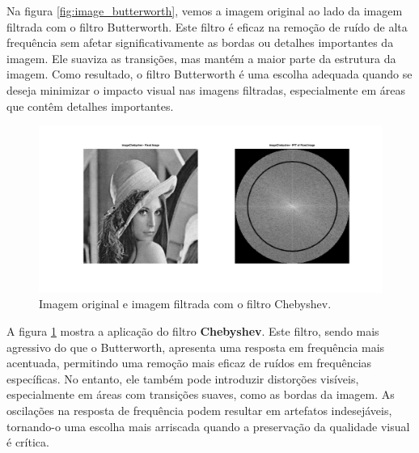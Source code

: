 Na figura \ref{fig:image_butterworth}, vemos a imagem original ao lado da imagem filtrada com o filtro Butterworth. Este filtro é eficaz na remoção de ruído de alta frequência sem afetar significativamente as bordas ou detalhes importantes da imagem. Ele suaviza as transições, mas mantém a maior parte da estrutura da imagem. Como resultado, o filtro Butterworth é uma escolha adequada quando se deseja minimizar o impacto visual nas imagens filtradas, especialmente em áreas que contêm detalhes importantes.

\begin{figure}[H]
    \centering
    \includegraphics[width=1\linewidth]{03_results/assets/image_chebyshev.png}
    \caption{Imagem original e imagem filtrada com o filtro Chebyshev.}
    \label{fig:image_chebyshev}
\end{figure}

A figura \ref{fig:image_chebyshev} mostra a aplicação do filtro \textbf{Chebyshev}. Este filtro, sendo mais agressivo do que o Butterworth, apresenta uma resposta em frequência mais acentuada, permitindo uma remoção mais eficaz de ruídos em frequências específicas. No entanto, ele também pode introduzir distorções visíveis, especialmente em áreas com transições suaves, como as bordas da imagem. As oscilações na resposta de frequência podem resultar em artefatos indesejáveis, tornando-o uma escolha mais arriscada quando a preservação da qualidade visual é crítica.

